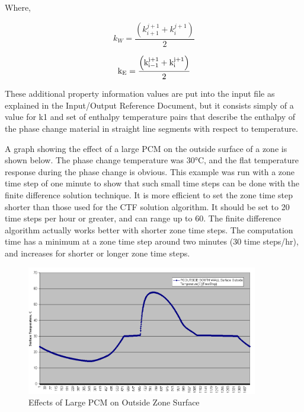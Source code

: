 Where,

\begin{equation}
{k_W} = \frac{{\left( {k_{i + 1}^{j + 1} + k_i^{j + 1}} \right)}}{2}
\end{equation}

\begin{equation}
{{\rm{k}}_{\rm{E}}} = \frac{{\left( {{\rm{k}}_{{\rm{i}} - 1}^{{\rm{j}} + 1} + {\rm{k}}_{\rm{i}}^{{\rm{j}} + 1}} \right)}}{2}
\end{equation}

These additional property information values are put into the input file as explained in the Input/Output Reference Document, but it consists simply of a value for k1 and set of enthalpy temperature pairs that describe the enthalpy of the phase change material in straight line segments with respect to temperature.

A graph showing the effect of a large PCM on the outside surface of a zone is shown below. The phase change temperature was 30°C, and the flat temperature response during the phase change is obvious. This example was run with a zone time step of one minute to show that such small time steps can be done with the finite difference solution technique. It is more efficient to set the zone time step shorter than those used for the CTF solution algorithm. It should be set to 20 time steps per hour or greater, and can range up to 60. The finite difference algorithm actually works better with shorter zone time steps. The computation time has a minimum at a zone time step around two minutes (30 time steps/hr), and increases for shorter or longer zone time steps.

\begin{figure}[hbtp] %
\centering
\includegraphics[width=0.9\textwidth, height=0.9\textheight, keepaspectratio=true]{media/image185.png}
\caption{Effects of Large PCM on Outside Zone Surface \protect \label{fig:effects-of-large-pcm-on-outside-zone-surface}}
\end{figure}

